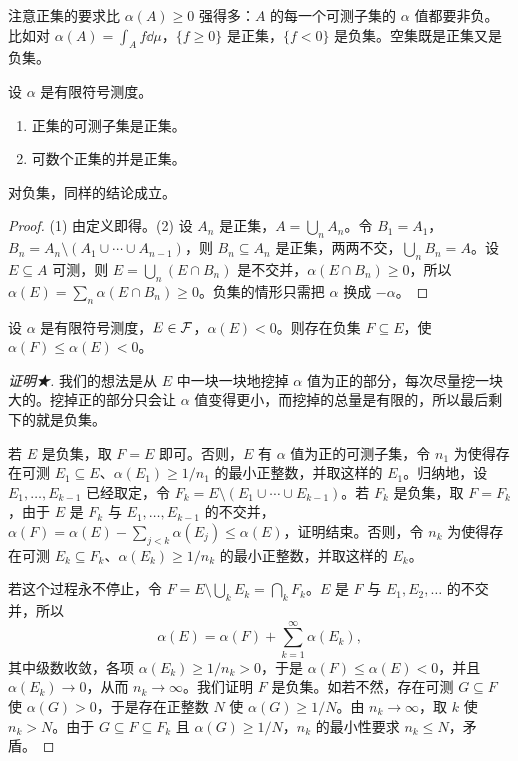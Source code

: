 注意正集的要求比 $\alpha(A)\geqslant0$ 强得多：$A$ 的每一个可测子集的 $\alpha$ 值都要非负。比如对 $\alpha(A)=\int_Af\dd\mu$，$\{f\geqslant0\}$ 是正集，$\{f<0\}$ 是负集。空集既是正集又是负集。

\begin{lemma}\label{lem:ac:positive-sets}
设 $\alpha$ 是有限符号测度。
\begin{enumerate}
\item 正集的可测子集是正集。
\item 可数个正集的并是正集。
\end{enumerate}
对负集，同样的结论成立。
\end{lemma}
\begin{proof}
(1) 由定义即得。(2) 设 $A_n$ 是正集，$A=\bigcup_nA_n$。令 $B_1=A_1$，$B_n=A_n\setminus(A_1\cup\cdots\cup A_{n-1})$，则 $B_n\subseteq A_n$ 是正集，两两不交，$\bigcup_nB_n=A$。设 $E\subseteq A$ 可测，则 $E=\bigcup_n(E\cap B_n)$ 是不交并，$\alpha(E\cap B_n)\geqslant0$，所以 $\alpha(E)=\sum_n\alpha(E\cap B_n)\geqslant0$。负集的情形只需把 $\alpha$ 换成 $-\alpha$。
\end{proof}

\begin{lemma}\label{lem:ac:negative-subset}
设 $\alpha$ 是有限符号测度，$E\in\mathcal{F}$，$\alpha(E)<0$。则存在负集 $F\subseteq E$，使 $\alpha(F)\leqslant\alpha(E)<0$。
\end{lemma}
\begin{proof}[证明★]
我们的想法是从 $E$ 中一块一块地挖掉 $\alpha$ 值为正的部分，每次尽量挖一块大的。挖掉正的部分只会让 $\alpha$ 值变得更小，而挖掉的总量是有限的，所以最后剩下的就是负集。

若 $E$ 是负集，取 $F=E$ 即可。否则，$E$ 有 $\alpha$ 值为正的可测子集，令 $n_1$ 为使得存在可测 $E_1\subseteq E$、$\alpha(E_1)\geqslant1/n_1$ 的最小正整数，并取这样的 $E_1$。归纳地，设 $E_1,\dots,E_{k-1}$ 已经取定，令 $F_k=E\setminus(E_1\cup\cdots\cup E_{k-1})$。若 $F_k$ 是负集，取 $F=F_k$，由于 $E$ 是 $F_k$ 与 $E_1,\dots,E_{k-1}$ 的不交并，$\alpha(F)=\alpha(E)-\sum_{j<k}\alpha(E_j)\leqslant\alpha(E)$，证明结束。否则，令 $n_k$ 为使得存在可测 $E_k\subseteq F_k$、$\alpha(E_k)\geqslant1/n_k$ 的最小正整数，并取这样的 $E_k$。

若这个过程永不停止，令 $F=E\setminus\bigcup_kE_k=\bigcap_kF_k$。$E$ 是 $F$ 与 $E_1,E_2,\dots$ 的不交并，所以
\[
\alpha(E)=\alpha(F)+\sum_{k=1}^\infty\alpha(E_k),
\]
其中级数收敛，各项 $\alpha(E_k)\geqslant1/n_k>0$，于是 $\alpha(F)\leqslant\alpha(E)<0$，并且 $\alpha(E_k)\to0$，从而 $n_k\to\infty$。我们证明 $F$ 是负集。如若不然，存在可测 $G\subseteq F$ 使 $\alpha(G)>0$，于是存在正整数 $N$ 使 $\alpha(G)\geqslant1/N$。由 $n_k\to\infty$，取 $k$ 使 $n_k>N$。由于 $G\subseteq F\subseteq F_k$ 且 $\alpha(G)\geqslant1/N$，$n_k$ 的最小性要求 $n_k\leqslant N$，矛盾。
\end{proof}

